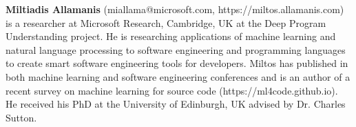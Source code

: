   {\bfseries Miltiadis Allamanis} (miallama@microsoft.com, https://miltos.allamanis.com) is a researcher at Microsoft Research, Cambridge, UK at the Deep Program Understanding project. He is researching applications of machine learning and natural language processing to software engineering and programming languages to create smart software engineering tools for developers. Miltos has published in both machine learning and software engineering conferences and is an author of a recent survey on machine learning for source code (https://ml4code.github.io). He received his PhD at the University of Edinburgh, UK advised by Dr. Charles Sutton.

